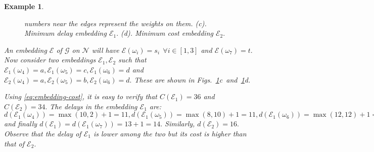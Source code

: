 \documentclass[journal]{IEEEtran}
\newtheorem{example}{{\bf Example}}
\newcommand{\net}{\mathcal{N}}
\newcommand{\compgraph}{\mathcal{G}}
\newcommand{\embedding}{\mathcal{E}}
\begin{document}
\begin{example}
\begin{figure}[tbp]
    numbers near the edges represent the weights on them.
    (c). Minimum delay embedding $\embedding_1.$ 
(d). Minimum cost embedding
    $\embedding_2.$
    \label{fig:sysmodel}
  \end{figure}
  An embedding $\embedding$ of $\compgraph$ on $\net$ will have
  $\embedding(\omega_i) = s_i \ \ \forall i \in [1,3]$ and
  $\embedding(\omega_7) = t.$ Now consider two embeddings
  $\embedding_1,\embedding_2$ such that $\embedding_1(\omega_4) =
  a,\embedding_1(\omega_5) = c,\embedding_1(\omega_6) = d$ and
  $\embedding_2(\omega_4) = a,\embedding_2(\omega_5) =
  b,\embedding_2(\omega_6) = d.$ These are shown in
  Figs.~\ref{fig:sysmodel}c~and~\ref{fig:sysmodel}d.

  Using \eqref{eq:embedding-cost}, it is easy to verify that
  $C(\embedding_1) = 36$ and $C(\embedding_2) = 34.$ The delays in the
  embedding $\embedding_1$ are: $d(\embedding_1(\omega_4)) =
  \max(10,2) +1= 11, d(\embedding_1(\omega_5)) = \max(8,10) +1= 11,
  d(\embedding_1(\omega_6)) = \max(12,12) +1= 13$ and finally
  $d(\embedding_1) = d(\embedding_1(\omega_7)) = 13+1=14.$ Similarly,
  $d(\embedding_2) = 16.$ Observe that the delay of $\embedding_1$ is
  lower among the two but its cost is higher than that of
  $\embedding_2.$ 
\end{example}
\end{document}
